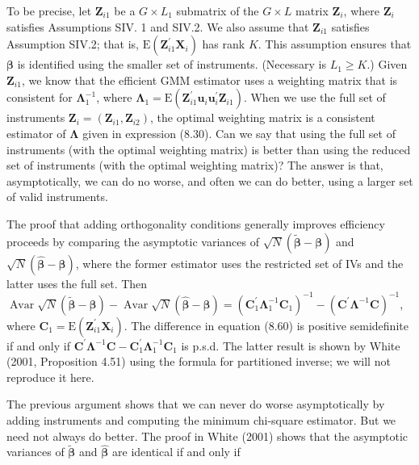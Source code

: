\documentclass[10pt]{article}
\begin{document}
To be precise, let $\mathbf{Z}_{i 1}$ be a $G \times L_{1}$ submatrix of the $G \times L$ matrix $\mathbf{Z}_{i}$, where $\mathbf{Z}_{i}$ satisfies Assumptions SIV. 1 and SIV.2. We also assume that $\mathbf{Z}_{i 1}$ satisfies Assumption SIV.2; that is, $\mathrm{E}\left(\mathbf{Z}_{i 1}^{\prime} \mathbf{X}_{i}\right)$ has rank $K$. This assumption ensures that $\boldsymbol{\beta}$ is identified using the smaller set of instruments. (Necessary is $L_{1} \geq K$.) Given $\mathbf{Z}_{i 1}$, we know that the efficient GMM estimator uses a weighting matrix that is consistent for $\boldsymbol{\Lambda}_{1}^{-1}$, where $\boldsymbol{\Lambda}_{1}=\mathrm{E}\left(\mathbf{Z}_{i 1}^{\prime} \mathbf{u}_{i} \mathbf{u}_{i}^{\prime} \mathbf{Z}_{i 1}\right)$. When we use the full set of instruments $\mathbf{Z}_{i}=\left(\mathbf{Z}_{i 1}, \mathbf{Z}_{i 2}\right)$, the optimal weighting matrix is a consistent estimator of $\boldsymbol{\Lambda}$ given in expression (8.30). Can we say that using the full set of instruments (with the optimal weighting matrix) is better than using the reduced set of instruments (with the optimal weighting matrix)? The answer is that, asymptotically, we can do no worse, and often we can do better, using a larger set of valid instruments.

The proof that adding orthogonality conditions generally improves efficiency proceeds by comparing the asymptotic variances of $\sqrt{N}(\tilde{\boldsymbol{\beta}}-\boldsymbol{\beta})$ and $\sqrt{N}(\hat{\boldsymbol{\beta}}-\boldsymbol{\beta})$, where the former estimator uses the restricted set of IVs and the latter uses the full set. Then\\
$\operatorname{Avar} \sqrt{N}(\tilde{\boldsymbol{\beta}}-\boldsymbol{\beta})-\operatorname{Avar} \sqrt{N}(\hat{\boldsymbol{\beta}}-\boldsymbol{\beta})=\left(\mathbf{C}_{1}^{\prime} \boldsymbol{\Lambda}_{1}^{-1} \mathbf{C}_{1}\right)^{-1}-\left(\mathbf{C}^{\prime} \boldsymbol{\Lambda}^{-1} \mathbf{C}\right)^{-1}$,\\
where $\mathbf{C}_{1}=\mathrm{E}\left(\mathbf{Z}_{i 1}^{\prime} \mathbf{X}_{i}\right)$. The difference in equation (8.60) is positive semidefinite if and only if $\mathbf{C}^{\prime} \boldsymbol{\Lambda}^{-1} \mathbf{C}-\mathbf{C}_{1}^{\prime} \boldsymbol{\Lambda}_{1}^{-1} \mathbf{C}_{1}$ is p.s.d. The latter result is shown by White (2001, Proposition 4.51) using the formula for partitioned inverse; we will not reproduce it here.

The previous argument shows that we can never do worse asymptotically by adding instruments and computing the minimum chi-square estimator. But we need not always do better. The proof in White (2001) shows that the asymptotic variances of $\tilde{\boldsymbol{\beta}}$ and $\hat{\boldsymbol{\beta}}$ are identical if and only if
\end{document}

